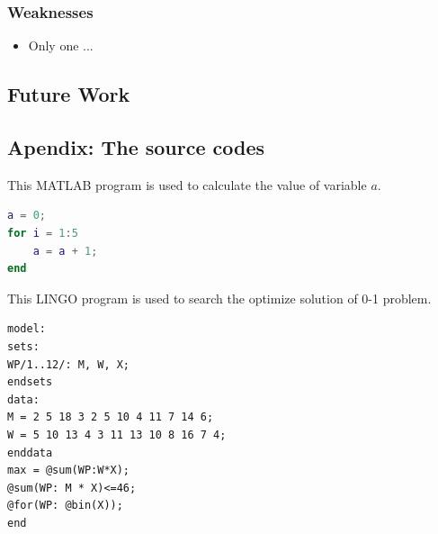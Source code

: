 \documentclass[12pt]{article}
\begin{document}
\subsubsection{Weaknesses}
\begin{itemize}
    \item Only one ...
\end{itemize}
 
\subsection{Future Work}






\clearpage
\begin{subappendices}						%
\section*{Apendix: The source codes}		%

This MATLAB program is used to calculate the value of variable $a$.
\begin{lstlisting}[language=Matlab, caption=\texttt{temp.m}]
a = 0;
for i = 1:5
	a = a + 1;
end
\end{lstlisting}

This LINGO program is used to search the optimize solution of 0-1 problem.
\begin{lstlisting}[language=Lingo, caption=\texttt{temp.lg4}]
model:
sets:
WP/1..12/: M, W, X;
endsets
data:
M = 2 5 18 3 2 5 10 4 11 7 14 6;
W = 5 10 13 4 3 11 13 10 8 16 7 4;
enddata
max = @sum(WP:W*X);
@sum(WP: M * X)<=46;
@for(WP: @bin(X));
end
\end{lstlisting}

\end{subappendices}
\end{document}
